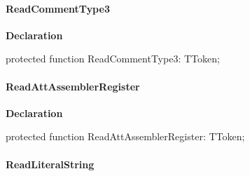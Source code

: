 \documentclass{report}
\newif\ifpdf
\begin{document}
\paragraph*{ReadCommentType3}\hspace*{\fill}

\label{PasDoc_Tokenizer.TTokenizer-ReadCommentType3}
\begin{list}{}{
\setlength{\itemindent}{0cm}
\setlength{\listparindent}{0cm}
\setlength{\leftmargin}{\evensidemargin}
\addtolength{\leftmargin}{\tmplength}
\settowidth{\labelsep}{X}
\addtolength{\leftmargin}{\labelsep}
\setlength{\labelwidth}{\tmplength}
}
\item[\textbf{Declaration}\hfill]
\ifpdf
\begin{flushleft}
\fi
\begin{ttfamily}
protected function ReadCommentType3: TToken;\end{ttfamily}

\ifpdf
\end{flushleft}
\fi

\end{list}
\paragraph*{ReadAttAssemblerRegister}\hspace*{\fill}

\label{PasDoc_Tokenizer.TTokenizer-ReadAttAssemblerRegister}
\begin{list}{}{
\setlength{\itemindent}{0cm}
\setlength{\listparindent}{0cm}
\setlength{\leftmargin}{\evensidemargin}
\addtolength{\leftmargin}{\tmplength}
\settowidth{\labelsep}{X}
\addtolength{\leftmargin}{\labelsep}
\setlength{\labelwidth}{\tmplength}
}
\item[\textbf{Declaration}\hfill]
\ifpdf
\begin{flushleft}
\fi
\begin{ttfamily}
protected function ReadAttAssemblerRegister: TToken;\end{ttfamily}

\ifpdf
\end{flushleft}
\fi

\end{list}
\paragraph*{ReadLiteralString}\hspace*{\fill}
\end{document}
